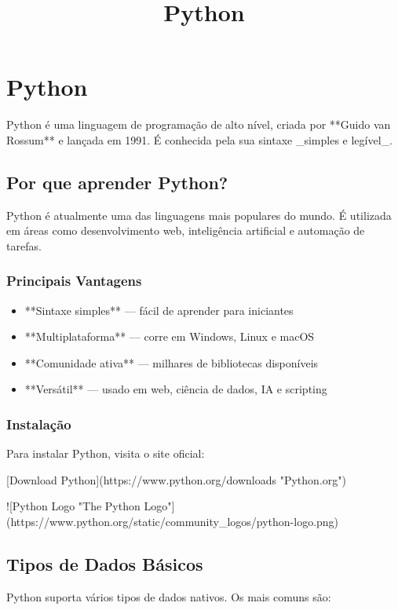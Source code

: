 \documentclass{article}
\title{Python}
\begin{document}
\maketitle

\section{Python}
Python é uma linguagem de programação de alto nível, criada por **Guido van Rossum**
e lançada em 1991. É conhecida pela sua sintaxe _simples e legível_.


\subsection{Por que aprender Python?}
Python é atualmente uma das linguagens mais populares do mundo. É utilizada em
áreas como desenvolvimento web, inteligência artificial e automação de tarefas.


\subsubsection{Principais Vantagens}
\begin{itemize}
  \item **Sintaxe simples** — fácil de aprender para iniciantes

  \item **Multiplataforma** — corre em Windows, Linux e macOS

  \item **Comunidade ativa** — milhares de bibliotecas disponíveis

  \item **Versátil** — usado em web, ciência de dados, IA e scripting

\end{itemize}
\subsubsection{Instalação}
Para instalar Python, visita o site oficial:


[Download Python](https://www.python.org/downloads "Python.org")


![Python Logo "The Python Logo"](https://www.python.org/static/community_logos/python-logo.png)


\subsection{Tipos de Dados Básicos}
Python suporta vários tipos de dados nativos. Os mais comuns são:
\end{document}
